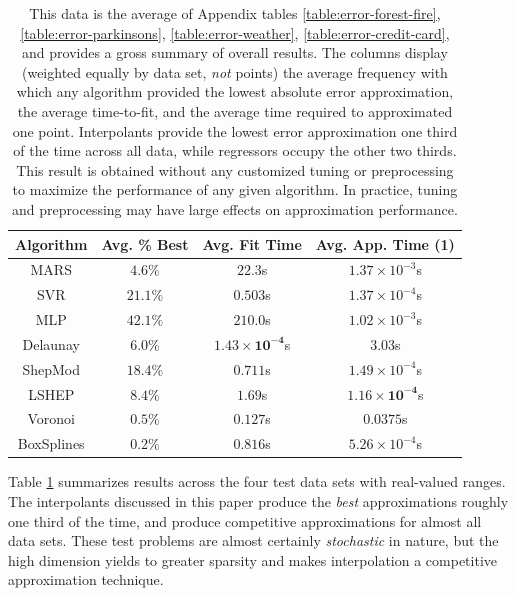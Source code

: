 \documentclass[smallextended,final]{svjour3}       %
\begin{document}
                                                                      
\begin{table}
  \centering
  \begin{tabular}{c|c|c|c}
    \hline
    Algorithm & Avg. \% Best & Avg. Fit Time & Avg. App. Time (1)\\
    \hline
    MARS & $4.6\%$ & $22.3$s & $1.37 \times 10^{-3}$s\\
    SVR & $\mathit{21.1}\%$ & $0.503$s & $\mathit{1.37 \times 10^{-4}}$s\\
    MLP & $\mathbf{42.1}\%$ & $210.0$s & $1.02 \times 10^{-3}$s\\
    Delaunay & $6.0\%$ & $\mathbf{1.43 \times 10^{-4}}$s & $3.03$s\\
    ShepMod & $18.4\%$ & $0.711$s & $1.49 \times 10^{-4}$s\\
    LSHEP & $8.4\%$ & $1.69$s & $\mathbf{1.16 \times 10^{-4}}$s\\
    Voronoi & $0.5\%$ & $\mathit{0.127}$s & $0.0375$s\\
    BoxSplines & $0.2\%$ & $0.816$s & $5.26 \times 10^{-4}$s\\
    \hline
  \end{tabular}
  \caption{This data is the average of Appendix tables \ref{table:error-forest-fire}, \ref{table:error-parkinsons}, \ref{table:error-weather}, \ref{table:error-credit-card}, and provides a gross summary of overall results. The columns display (weighted equally by data set, \textit{not} points) the average frequency with which any algorithm provided the lowest absolute error approximation, the average time-to-fit, and the average time required to approximated one point. Interpolants provide the lowest error approximation one third of the time across all data, while regressors occupy the other two thirds. This result is obtained without any customized tuning or preprocessing to maximize the performance of any given algorithm. In practice, tuning and preprocessing may have large effects on approximation performance.}
  \label{table:avg-performance}
\end{table}

Table \ref{table:avg-performance} summarizes results across the four test data sets with real-valued ranges. The interpolants discussed in this paper produce the \textit{best} approximations roughly one third of the time, and produce competitive approximations for almost all data sets. These test problems are almost certainly \textit{stochastic} in nature, but the high dimension yields to greater sparsity and makes interpolation a competitive approximation technique.
\end{document}
